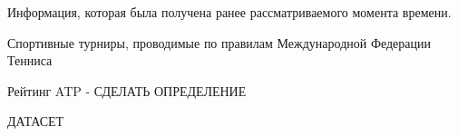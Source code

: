 \Defines %
\begin{description}
	
	\item[Априорная информация]  Информация, которая была получена ранее рассматриваемого момента времени\cite{def01}.
	\item[Теннис] Спортивные турниры, проводимые по правилам Международной Федерации Тенниса\cite{Book04}
	\item Рейтинг ATP - СДЕЛАТЬ ОПРЕДЕЛЕНИЕ
	\item ДАТАСЕТ 
	
	
\end{description}

